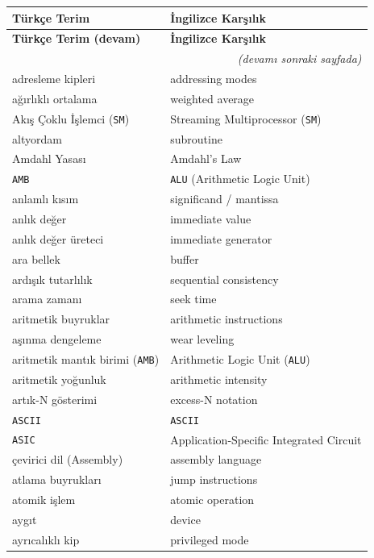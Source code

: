 {\small
\begin{longtable}{@{}p{7.6cm}p{7.6cm}@{}}
\toprule
\textbf{Türkçe Terim} & \textbf{İngilizce Karşılık} \\
\midrule
\endfirsthead

\toprule
\textbf{Türkçe Terim (devam)} & \textbf{İngilizce Karşılık} \\
\midrule
\endhead

\midrule
\multicolumn{2}{r}{\small\textit{(devamı sonraki sayfada)}} \\
\endfoot

\bottomrule
\endlastfoot

adresleme kipleri & addressing modes \\
ağırlıklı ortalama & weighted average \\
Akış Çoklu İşlemci (\texttt{SM}) & Streaming Multiprocessor (\texttt{SM}) \\
altyordam & subroutine \\
Amdahl Yasası & Amdahl's Law \\
\texttt{AMB} & \texttt{ALU} (Arithmetic Logic Unit) \\
anlamlı kısım & significand / mantissa \\
anlık değer & immediate value \\
anlık değer üreteci & immediate generator \\
ara bellek & buffer \\
ardışık tutarlılık & sequential consistency \\
arama zamanı & seek time \\
aritmetik buyruklar & arithmetic instructions \\
aşınma dengeleme & wear leveling \\
aritmetik mantık birimi (\texttt{AMB}) & Arithmetic Logic Unit (\texttt{ALU}) \\
aritmetik yoğunluk & arithmetic intensity \\
artık-N gösterimi & excess-N notation \\
\texttt{ASCII} & \texttt{ASCII} \\
\texttt{ASIC} & Application-Specific Integrated Circuit \\
çevirici dil (Assembly) & assembly language \\
atlama buyrukları & jump instructions \\
atomik işlem & atomic operation \\
aygıt & device \\
ayrıcalıklı kip & privileged mode \\


\end{longtable}}
